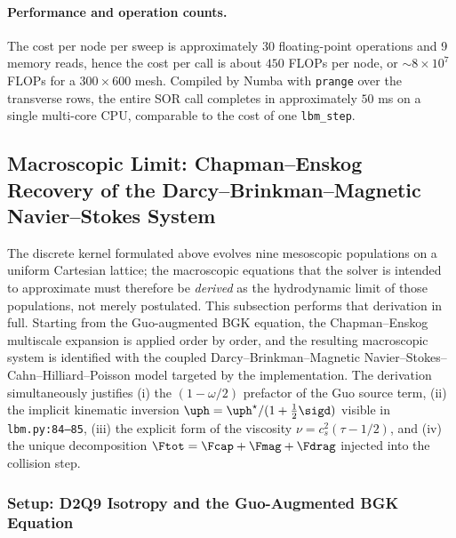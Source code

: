 \paragraph{Performance and operation counts.}
The cost per node per sweep is approximately 30 floating-point operations and 9 memory reads, hence the cost per call is about $450$ FLOPs per node, or $\sim 8\times 10^{7}$ FLOPs for a $300\times 600$ mesh.
Compiled by Numba with \texttt{prange} over the transverse rows, the entire SOR call completes in approximately $50$ ms on a single multi-core CPU, comparable to the cost of one \texttt{lbm\_step}.

\subsection{Macroscopic Limit: Chapman--Enskog Recovery of the Darcy--Brinkman--Magnetic Navier--Stokes System}\label{sec:chapman-enskog}

The discrete kernel formulated above evolves nine mesoscopic populations on a uniform Cartesian lattice;
the macroscopic equations that the solver is intended to approximate must therefore be \emph{derived} as the hydrodynamic limit of those populations, not merely postulated.
This subsection performs that derivation in full. Starting from the Guo-augmented BGK equation, the Chapman--Enskog multiscale expansion is applied order by order, and the resulting macroscopic system is identified with the coupled Darcy--Brinkman--Magnetic Navier--Stokes--Cahn--Hilliard--Poisson model targeted by the implementation.
The derivation simultaneously justifies (i) the $(1-\omega/2)$ prefactor of the Guo source term, (ii) the implicit kinematic inversion $\uph = \uph^{\star}/(1+\tfrac{1}{2}\sigd)$ visible in \texttt{lbm.py:84--85}, (iii) the explicit form of the viscosity $\nu = c_s^{2}(\tau-1/2)$, and (iv) the unique decomposition $\Ftot = \Fcap + \Fmag + \Fdrag$ injected into the collision step.

\subsubsection{Setup: D2Q9 Isotropy and the Guo-Augmented BGK Equation}\label{sec:ce-setup}


